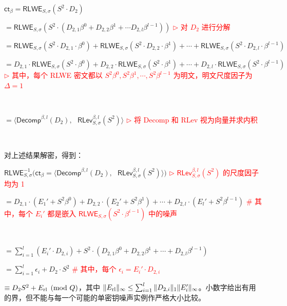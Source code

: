 $\textsf{ct}_\beta = \textsf{RLWE}_{S, \sigma}(S^2 \cdot D_2)$

$= \textsf{RLWE}_{S, \sigma}\left( S^2 \cdot \left(D_{2,1}\beta^{0} + D_{2,2}\beta^{1} + \cdots D_{2,l}\beta^{l-1}\right)\right)$ \textcolor{red}{ $\rhd$ 对 $D_2$ 进行分解}

$= \textsf{RLWE}_{S, \sigma}\left( S^2 \cdot D_{2,1} \cdot \beta^{0}\right) + \textsf{RLWE}_{S, \sigma}\left( S^2 \cdot D_{2,2} \cdot \beta^{1}\right) + \cdots + \textsf{RLWE}_{S, \sigma}\left( S^2 \cdot D_{2,l} \cdot \beta^{l-1}\right)$

$= D_{2,1}\cdot\textsf{RLWE}_{S, \sigma}\left( S^2 \cdot \beta^{0}\right) + D_{2,2}\cdot\textsf{RLWE}_{S, \sigma}\left( S^2 \cdot \beta^{1}\right) + \cdots + D_{2,l}\cdot\textsf{RLWE}_{S, \sigma}\left( S^2 \cdot \beta^{l-1}\right)$
\textcolor{red}{ $\rhd$ 其中，每个 \textsf{RLWE} 密文都以 $S^2\beta^{0}, S^2\beta^{1}, \cdots, S^2\beta^{l-1}$ 为明文，明文尺度因子为 $\Delta = 1$}

$ $

$= \bm{\langle} \textsf{Decomp}^{\beta, l}(D_2), \text{ } \textsf{RLev}_{S, \sigma}^{\beta, l}( S^2) \bm{\rangle}$ \textcolor{red}{ $\rhd$ 将 \textsf{Decomp} 和 \textsf{RLev} 视为向量并求内积}

$ $

对上述结果解密，得到：

$\textsf{RLWE}_{S, \sigma}^{-1}(\textsf{ct}_\beta = \bm{\langle} \textsf{Decomp}^{\beta, l}(D_2), \text{ } \textsf{RLev}_{S, \sigma}^{\beta, l}( S^2) \bm{\rangle} \bm{)}$ \textcolor{red}{ $\rhd$ $\textsf{RLev}_{S, \sigma}^{\beta, l}( S^2)$ 的尺度因子均为 1}

$= D_{2,1}\cdot\left(E_1' +  S^2\beta^{0}\right) + D_{2,2}\cdot\left(E_2' +  S^2\beta^{1}\right) + \cdots + D_{2,l}\cdot\left(E_l' +  S^2\beta^{l-1}\right)$ \textcolor{red}{ \text{ } \# 其中，每个 $E_i'$ 都是嵌入 $\textsf{RLWE}_{S, \sigma}\left(S^2\cdot\beta^{i-1}\right)$ 中的噪声}

$ $

$= \sum\limits_{i=1}^{l} (E_i'\cdot D_{2,i}) +  S^2\cdot\left(D_{2,1}\beta^{0} + D_{2,2}\beta^{1} + \cdots + D_{2, l}\beta^{l-1}\right)$

$= \sum\limits_{i=1}^{l} \epsilon_{i} + D_2\cdot S^2$ \textcolor{red}{ \text{ } \# 其中，每个 $\epsilon_i = E_i'\cdot D_{2,i}$}

$\equiv D_2S^2+E_{\rm rl}\pmod Q$，其中 $\|E_{\rm rl}\|_\infty\leq\sum_{i=1}^l\|D_{2,i}\|_1\|E_i'\|_\infty$。小数字给出有用的界，但不能与每一个可能的单密钥噪声实例作严格大小比较。

